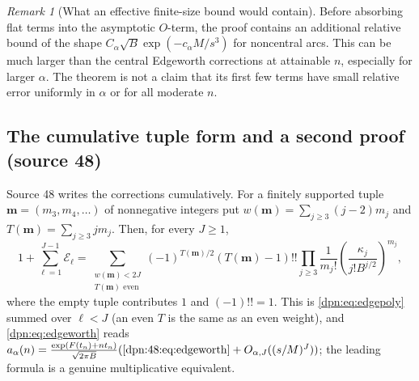 \documentclass[11pt]{article}
\numberwithin{equation}{section}
\theoremstyle{definition}\newtheorem{definition}[theorem]{Definition}
\theoremstyle{remark}\newtheorem{remark}[theorem]{Remark}
\newcommand{\src}[1]{\textup{(source #1)}}
\begin{document}
\begin{remark}[What an effective finite-size bound would contain]\label{dpn:rem:effective}
Before absorbing flat terms into the asymptotic $O$-term, the proof contains
an additional relative bound of the shape
$C_\alpha\sqrt B\exp(-c_\alpha M/s^3)$ for noncentral arcs.
This can be much larger than the central Edgeworth corrections at attainable
$n$, especially for larger $\alpha$. The theorem is not a claim that its
first few terms have small relative error uniformly in $\alpha$ or for all
moderate $n$.
\end{remark}

\subsection{The cumulative tuple form and a second proof \src{48}}
Source 48 writes the corrections cumulatively.  For a finitely supported tuple
$\bm m=(m_3,m_4,\ldots)$ of nonnegative integers put
$w(\bm m)=\sum_{j\ge3}(j-2)m_j$ and $T(\bm m)=\sum_{j\ge3}jm_j$.  Then, for
every $J\ge1$,
\begin{equation}\label{dpn:48:eq:edgeworth}
 1+\sum_{\ell=1}^{J-1}\mathcal E_\ell=
 \sum_{\substack{w(\bm m)<2J\\T(\bm m)\text{ even}}}
 (-1)^{T(\bm m)/2}(T(\bm m)-1)!!
 \prod_{j\ge3}\frac{1}{m_j!}
       \left(\frac{\kappa_j}{j!B^{j/2}}\right)^{m_j},
\end{equation}
where the empty tuple contributes $1$ and $(-1)!!=1$.  This is
\eqref{dpn:eq:edgepoly} summed over $\ell<J$ (an even $T$ is the same as an
even weight), and \eqref{dpn:eq:edgeworth} reads
$a_\alpha(n)=\frac{\exp(F(t_n)+nt_n)}{\sqrt{2\pi B}}(\text{\eqref{dpn:48:eq:edgeworth}}
+O_{\alpha,J}((s/M)^J))$; the leading formula is a genuine multiplicative
equivalent.
\end{document}
